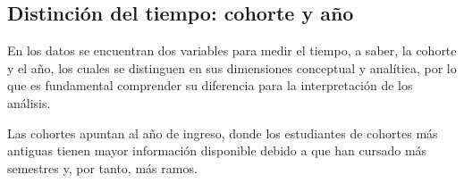 \documentclass[
  spanish,
  a4paper,
  oneside]{scrbook}
\begin{document}
\begin{table}

\caption{\label{tbl-desc-cat}Descriptivos variables categóricas}


\end{table}%

\subsection{Distinción del tiempo: cohorte y
año}\label{distinciuxf3n-del-tiempo-cohorte-y-auxf1o}

En los datos se encuentran dos variables para medir el tiempo, a saber,
la cohorte y el año, los cuales se distinguen en sus dimensiones
conceptual y analítica, por lo que es fundamental comprender su
diferencia para la interpretación de los análisis.

Las cohortes apuntan al año de ingreso, donde los estudiantes de
cohortes más antiguas tienen mayor información disponible debido a que
han cursado más semestres y, por tanto, más ramos.
\end{document}
